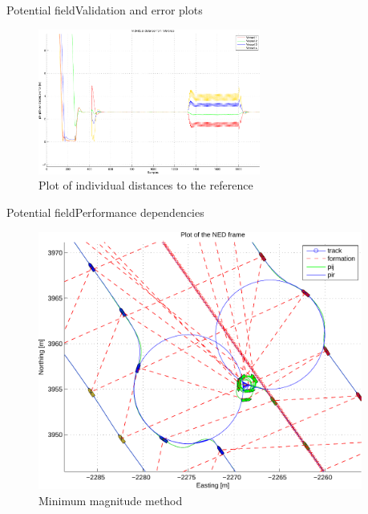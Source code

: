 \documentclass[10pt,handout]{beamer}
\begin{document}
\begin{frame}{Potential field}{Validation and error plots}
  \begin{figure}
    \includegraphics[width=0.65\textwidth]{img/pdfdistfromref}
    \caption{Plot of individual distances to the reference}
  \end{figure}
\end{frame}

\begin{frame}{Potential field}{Performance dependencies}
  \begin{figure}
    \includegraphics[width=0.95\textwidth]{img/wp_gen_ass_fail}
    \caption{Minimum magnitude method}
  \end{figure}
\end{frame}
\end{document}
